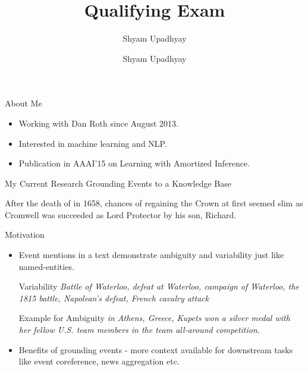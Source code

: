 

\author{Shyam Upadhyay}
\title{Qualifying Exam}

\date{Shyam Upadhyay} 



\begin{frame}
\titlepage
\end{frame}

\begin{frame}{About Me}
\begin{itemize}
\item Working with Dan Roth since August 2013.
\item Interested in machine learning and NLP.
\item Publication in AAAI'15 on Learning with Amortized Inference.
\end{itemize}
\end{frame}

\begin{frame}{My Current Research}
Grounding Events to a Knowledge Base

\begin{block}{}
After the {\color{blue} death of } in 1658,  chances of regaining the Crown at first seemed slim as Cromwell was succeeded as Lord Protector by his son, Richard.
\end{block}

\end{frame}

\begin{frame}{Motivation}
\begin{itemize}
\item Event mentions in a text demonstrate ambiguity and variability just like named-entities.
\begin{exampleblock}{Variability}
\emph{Battle of Waterloo, defeat at Waterloo, campaign of Waterloo, the 1815 battle, Napolean's defeat, French cavalry attack}
\end{exampleblock}
\begin{exampleblock}{Example for Ambiguity}
\emph{ in Athens, Greece, Kupets won a silver medal with her fellow U.S. team members in the team all-around competition.}
\end{exampleblock}
\item Benefits of grounding events - more context available for downstream tasks like event coreference, news aggregation etc.
\end{itemize}
\end{frame}

